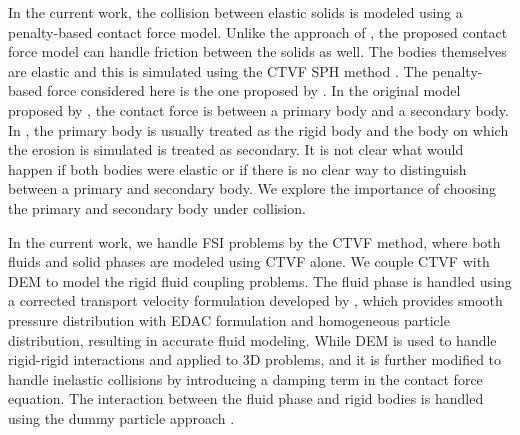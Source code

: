 In the current work, the collision between elastic solids is modeled using a
penalty-based contact force model. Unlike the approach of
\cite{yan2021simulation}, the proposed contact force model can handle friction
between the solids as well. The bodies themselves are elastic and this is
simulated using the CTVF SPH method \cite{adepu2021corrected}. The penalty-based
force considered here is the one proposed by \citet{mohseni2021particle}. In the
original model proposed by \cite{mohseni2021particle}, the contact force is
between a primary body and a secondary body. In \cite{mohseni2021particle}, the
primary body is usually treated as the rigid body and the body on which the
erosion is simulated is treated as secondary. It is not clear what would happen
if both bodies were elastic or if there is no clear way to distinguish between a
primary and secondary body. We explore the importance of choosing the primary
and secondary body under collision.

In the current work, we handle FSI problems by the CTVF method, where both
fluids and solid phases are modeled using CTVF alone. We couple CTVF with DEM to
model the rigid fluid coupling problems. The fluid phase is handled using a
corrected transport velocity formulation developed by \cite{adepu2021corrected},
which provides smooth pressure distribution with EDAC formulation and
homogeneous particle distribution, resulting in accurate fluid modeling. While
DEM is used to handle rigid-rigid interactions and applied to 3D problems, and
it is further modified to handle inelastic collisions by introducing a damping
term in the contact force equation. The interaction between the fluid phase and
rigid bodies is handled using the dummy particle approach \citep{Adami2012}.



